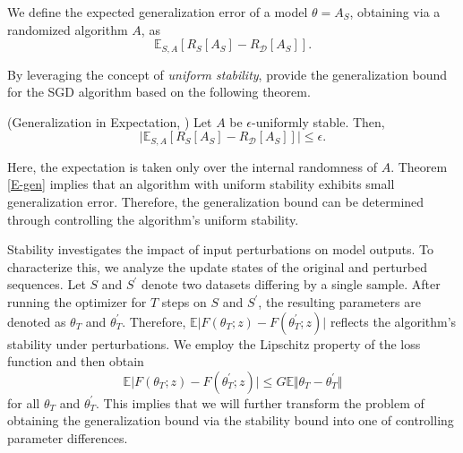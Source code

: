 We define the expected generalization error of a model $\theta = A_S$, obtaining via a randomized algorithm $A$, as
\begin{equation}\label{D-gen}
\mathbb{E}_{S,A}\left[R_{S}\left[A_S\right]-R_\mathcal{D}\left[A_S\right]\right]. 
\end{equation}

By leveraging the concept of \emph{uniform stability}, \citet{hardt2016train} provide the generalization bound for the SGD algorithm based on the following theorem.
\begin{theorem}{\rm (Generalization in Expectation, \citet[Theorem 2.2]{hardt2016train})}\label{E-gen}
Let $A$ be $\epsilon$-uniformly stable. Then,
    \begin{equation}
     \vert\mathbb{E}_{S,A}\left[R_{S}\left[A_S\right]-R_\mathcal{D}\left[A_S\right]\right]\vert \leq \epsilon.
    \end{equation}
\end{theorem}

\begin{remark}
Here, the expectation is taken only over the internal randomness of $A$. Theorem \ref{E-gen} implies that an algorithm with uniform stability exhibits small generalization error. Therefore, the generalization bound can be determined through controlling the algorithm's uniform stability.   
\end{remark}


Stability investigates the impact of input perturbations on model outputs. To characterize this, we analyze the update states of the original and perturbed sequences. Let $S$ and $S^{\prime}$ denote two datasets differing by a single sample. After running the optimizer for $T$ steps on $S$ and $S^{\prime}$, the resulting parameters are denoted as $\theta_T$ and $\theta_T^{\prime}$. Therefore, $\mathbb{E}\vert F(\theta_T;z)-F(\theta_T^{\prime};z)\vert$ reflects the algorithm's stability under perturbations. We employ the Lipschitz property of the loss function and then obtain
\begin{equation}\label{convex-basic}
\mathbb{E}\vert F(\theta_T;z)-F(\theta_T^{\prime};z)\vert \leq G \mathbb{E}\Vert \theta_T -\theta^{\prime}_T \Vert
 \end{equation}
for all $\theta_T$ and $\theta_T^{\prime}$.
This implies that we will further transform the problem of obtaining the generalization bound via the stability bound into one of controlling parameter differences. 

